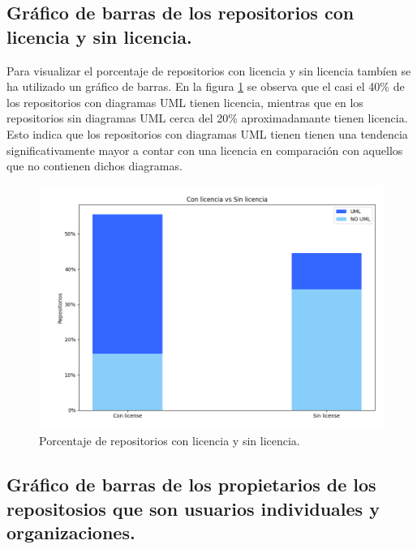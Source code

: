 \documentclass[a4paper, 12pt]{book}
\begin{document}
\subsection{Gráfico de barras de los repositorios con licencia y sin licencia. }
\label{sec:Gráfico de barras de los repositorios con licencia y sin licencia}

Para visualizar el porcentaje de repositorios con licencia y sin licencia tambíen se ha utilizado un gráfico de barras.
En la figura \ref{fig:Figure_license} se observa que el casi el 40\% de los repositorios con diagramas UML tienen licencia, mientras que en los repositorios sin diagramas UML cerca del 20\% aproximadamante tienen licencia.
Esto indica que los repositorios con diagramas UML tienen tienen una tendencia significativamente mayor a contar con una licencia en comparación con aquellos que no contienen dichos diagramas.

\begin{figure}
  \centering
  \includegraphics[width=12cm, keepaspectratio]{img/Figure_license.png}
  \caption{Porcentaje de repositorios con licencia y sin licencia.}\label{fig:Figure_license}
\end{figure}

\subsection{Gráfico de barras de los propietarios de los repositosios que son usuarios individuales y organizaciones.}
\label{sec:Gráfico de barras de los propietarios de los repositosios que son usuarios individuales y organizaciones}
\end{document}
